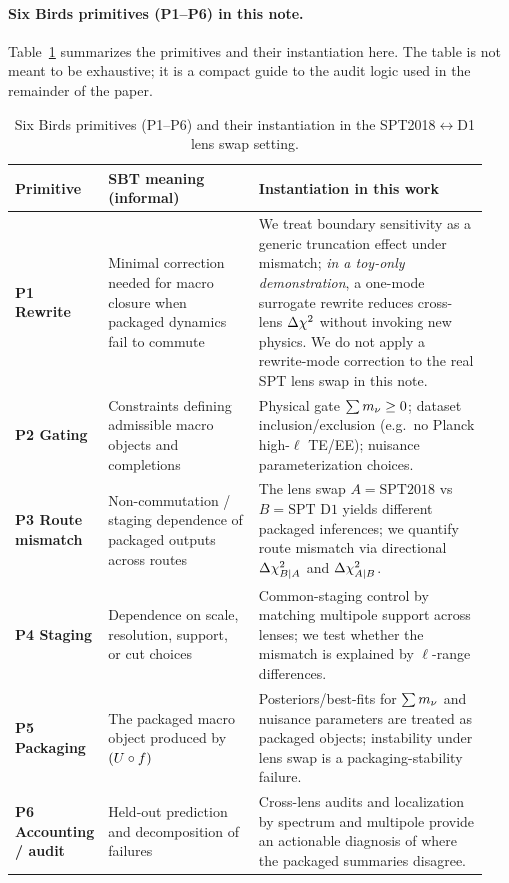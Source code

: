 \paragraph{Six Birds primitives (P1--P6) in this note.}
Table~\ref{tab:sixbirds_primitives} summarizes the primitives and their instantiation here. The table is not meant to be exhaustive; it is a compact guide to the audit logic used in the remainder of the paper.

\begin{table}[t]
  \centering
  \caption{Six Birds primitives (P1--P6) and their instantiation in the SPT2018$\leftrightarrow$D1 lens swap setting.}
  \label{tab:sixbirds_primitives}
  \small
  \begin{tabular}{p{0.07\linewidth} p{0.34\linewidth} p{0.53\linewidth}}
    \toprule
    Primitive & SBT meaning (informal) & Instantiation in this work \\
    \midrule
    \textbf{P1 Rewrite} &
    Minimal correction needed for macro closure when packaged dynamics fail to commute &
    We treat boundary sensitivity as a generic truncation effect under mismatch; \emph{in a toy-only demonstration}, a one-mode surrogate rewrite reduces cross-lens $\Delta \chi^2$ without invoking new physics. We do not apply a rewrite-mode correction to the real SPT lens swap in this note. \\
    \textbf{P2 Gating} &
    Constraints defining admissible macro objects and completions &
    Physical gate $\sum m_\nu\ge 0$; dataset inclusion/exclusion (e.g.\ no Planck high-$\ell$ TE/EE); nuisance parameterization choices. \\
    \textbf{P3 Route mismatch} &
    Non-commutation / staging dependence of packaged outputs across routes &
    The lens swap $A=\text{SPT2018}$ vs $B=\text{SPT D1}$ yields different packaged inferences; we quantify route mismatch via directional $\Delta \chi^2_{B|A}$ and $\Delta \chi^2_{A|B}$. \\
    \textbf{P4 Staging} &
    Dependence on scale, resolution, support, or cut choices &
    Common-staging control by matching multipole support across lenses; we test whether the mismatch is explained by $\ell$-range differences. \\
    \textbf{P5 Packaging} &
    The packaged macro object produced by $(U\circ f)$ &
    Posteriors/best-fits for $\sum m_\nu$ and nuisance parameters are treated as packaged objects; instability under lens swap is a packaging-stability failure. \\
    \textbf{P6 Accounting / audit} &
    Held-out prediction and decomposition of failures &
    Cross-lens audits and localization by spectrum and multipole provide an actionable diagnosis of where the packaged summaries disagree. \\
    \bottomrule
  \end{tabular}
\end{table}

